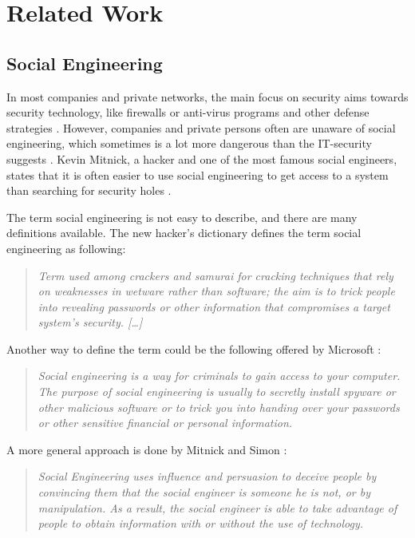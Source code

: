 \chapter{Related Work}
\label{chap:relatedwork}

\section{Social Engineering}

In most companies and private networks, the main focus on security aims towards
security technology, like firewalls or anti-virus programs and other defense
strategies \cite{winkler1995}. However, companies and private persons often are unaware of social
engineering, which sometimes is a lot more dangerous than the IT-security
suggests \cite{jones2004}. Kevin Mitnick, a hacker and one of the most famous social
engineers, states that it is often easier to use social engineering to get
access to a system than searching for security holes \cite{mitnick2003}.

The term social engineering is not easy to describe, and there are many
definitions available. 
The new hacker's dictionary \cite{raymond1996} defines the term social engineering as
following:
\begin{quote}
\textit{Term used among crackers and samurai for cracking techniques that rely on
weaknesses in wetware rather than software; the aim is to trick people into
revealing passwords or other information that compromises a target system's
security. [\dots]}
\end{quote}

Another way to define the term could be the following offered by Microsoft
\cite{microsoft2009}:
\begin{quote}
\textit{Social engineering is a way for criminals to gain access to your computer. The
purpose of social engineering is usually to secretly install spyware or other
malicious software or to trick you into handing over your passwords or other
sensitive financial or personal information.}
\end{quote}

A more general approach is done by Mitnick and Simon \cite{mitnick2003}:
\begin{quote}
\textit{Social Engineering uses influence and persuasion to deceive people
by convincing them that the social engineer is someone he is not,
or by manipulation. As a result, the social engineer is able to take
advantage of people to obtain information with or without the use of
technology.}
\end{quote}

